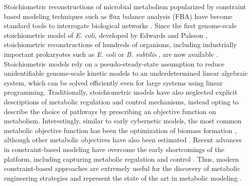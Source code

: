 \documentclass[journal=asbcd6,manuscript=article]{achemso}
\begin{document}
Stoichiometric reconstructions of microbial metabolism popularized by constraint based modeling techniques such as flux balance analysis (FBA) have become standard tools to interrogate biological networks \cite{2012_lewis_palsson_NatRevMicrobio}.
Since the first genome-scale stoichiometric model of \textit{E. coli}, developed by Edwards and Palsson \cite{2000_edwards_palsson_PNAS}, stoichiometric reconstructions of hundreds of organisms, including industrially important prokaryotes such as \textit{E. coli} \cite{Feist:2007aa} or \textit{B. subtilis} \cite{Oh:2007aa}, are now available \cite{2009_feist_palsson_NatRevMicrobio}.
Stoichiometric models rely on a pseudo-steady-state assumption to reduce unidentifiable genome-scale kinetic models to an underdetermined linear algebraic system, which can be solved efficiently even for large systems using linear programming.
Traditionally, stoichiometric models have also neglected explicit descriptions of metabolic regulation and control mechanisms, instead opting to describe the choice of pathways by prescribing an objective function on metabolism.
Interestingly, similar to early cybernetic models, the most common metabolic objective function has been the optimization of biomass formation \cite{2002_ibarra_edwards_palsson_Nat}, although other metabolic objectives have also been estimated \cite{2007_schuetz_sauer_MolSysBio}.
Recent advances in constraint-based modeling have overcome the early shortcomings of the platform, including capturing metabolic regulation and control \cite{2013_hyduke_lewis_palsson_MolBioSys}. Thus, modern constraint-based approaches are extremely useful for the discovery of metabolic engineering strategies and represent the state of the art in metabolic modeling \cite{2013_mccloskey_palsson_feist_MolSysBio, 2012_zomorrodi_maranas_MetaEng}.
\end{document}
